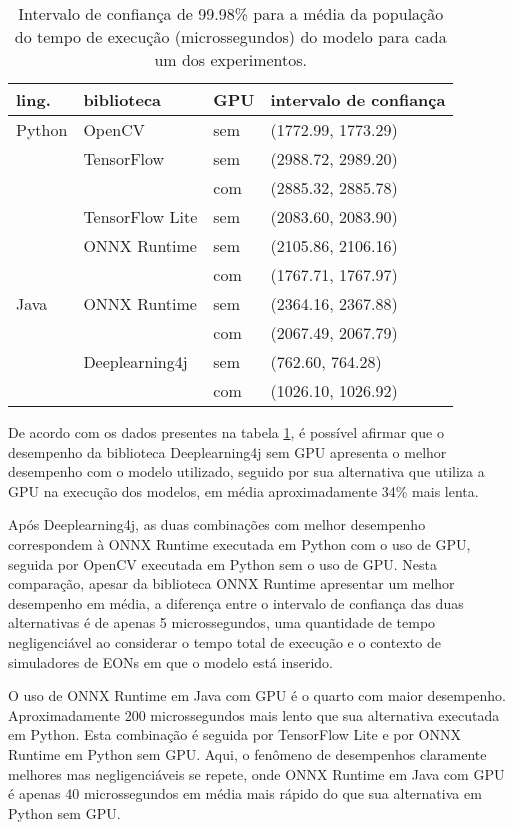 \begin{table}
  \centering
  \begin{tabular}{llll}
    \toprule
    ling.  & biblioteca      & GPU & intervalo de confiança \\
    \midrule
    Python & OpenCV          & sem & (1772.99, 1773.29)     \\
           & TensorFlow      & sem & (2988.72, 2989.20)     \\
           &                 & com & (2885.32, 2885.78)     \\
           & TensorFlow Lite & sem & (2083.60, 2083.90)     \\
           & ONNX Runtime    & sem & (2105.86, 2106.16)     \\
           &                 & com & (1767.71, 1767.97)     \\
    Java   & ONNX Runtime    & sem & (2364.16, 2367.88)     \\
           &                 & com & (2067.49, 2067.79)     \\
           & Deeplearning4j  & sem & (762.60, 764.28)       \\
           &                 & com & (1026.10, 1026.92)     \\

    \bottomrule
  \end{tabular}
  \caption{Intervalo de confiança de 99.98\% para a média da população do tempo de execução (microssegundos) do modelo para cada um dos experimentos.}
  \label{tab:ci}
\end{table}

De acordo com os dados presentes na tabela \ref{tab:ci}, é possível afirmar que o desempenho da biblioteca Deeplearning4j sem GPU apresenta o melhor desempenho com o modelo utilizado, seguido por sua alternativa que utiliza a GPU na execução dos modelos, em média aproximadamente 34\% mais lenta.

Após Deeplearning4j, as duas combinações com melhor desempenho correspondem à ONNX Runtime executada em Python com o uso de GPU, seguida por OpenCV executada em Python sem o uso de GPU. Nesta comparação, apesar da biblioteca ONNX Runtime apresentar um melhor desempenho em média, a diferença entre o intervalo de confiança das duas alternativas é de apenas 5 microssegundos, uma quantidade de tempo negligenciável ao considerar o tempo total de execução e o contexto de simuladores de EONs em que o modelo está inserido.

O uso de ONNX Runtime em Java com GPU é o quarto com maior desempenho. Aproximadamente 200 microssegundos mais lento que sua alternativa executada em Python. Esta combinação é seguida por TensorFlow Lite e por ONNX Runtime em Python sem GPU. Aqui, o fenômeno de desempenhos claramente melhores mas negligenciáveis se repete, onde ONNX Runtime em Java com GPU é apenas 40 microssegundos em média mais rápido do que sua alternativa em Python sem GPU.

